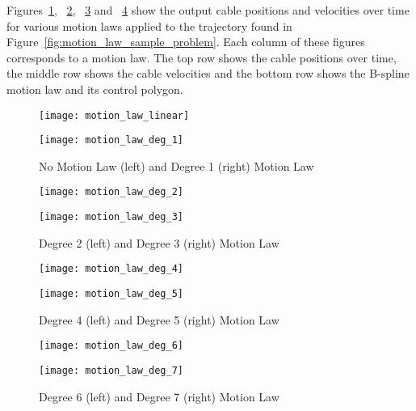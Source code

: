 	Figures~\ref{fig:motion_law_lin_1}, ~\ref{fig:motion_law_2_3},
	~\ref{fig:motion_law_4_5} and ~\ref{fig:motion_law_6_7} show the output
	cable positions and velocities over time for various motion laws applied to
	the trajectory found in Figure~\ref{fig:motion_law_sample_problem}. Each
	column of these figures corresponds to a motion law. The top row shows the
	cable positions over time, the middle row shows the cable velocities and the
	bottom row shows the B-spline motion law and its control polygon.

	\begin{figure}[hb]
		\centering
		\begin{minipage}{0.45\textwidth}
			\texttt{[image: motion\_law\_linear]}
		\end{minipage}%
		\begin{minipage}{0.45\textwidth}
			\texttt{[image: motion\_law\_deg\_1]}
		\end{minipage}
		\caption{No Motion Law (left) and Degree 1 (right) Motion Law}
		\label{fig:motion_law_lin_1}
	\end{figure}

	\begin{figure}[hb]
		\centering
		\begin{minipage}{0.45\textwidth}
			\texttt{[image: motion\_law\_deg\_2]}
		\end{minipage}%
		\begin{minipage}{0.45\textwidth}
			\texttt{[image: motion\_law\_deg\_3]}
		\end{minipage}%
		\caption{Degree 2 (left) and Degree 3 (right) Motion Law}
		\label{fig:motion_law_2_3}
	\end{figure}

	\begin{figure}[hb]
		\centering
		\begin{minipage}{0.45\textwidth}
			\texttt{[image: motion\_law\_deg\_4]}
		\end{minipage}%
		\begin{minipage}{0.45\textwidth}
			\texttt{[image: motion\_law\_deg\_5]}
		\end{minipage}%
		\caption{Degree 4 (left) and Degree 5 (right) Motion Law}
		\label{fig:motion_law_4_5}
	\end{figure}

	\begin{figure}[hb]
		\centering
		\begin{minipage}{0.45\textwidth}
			\texttt{[image: motion\_law\_deg\_6]}
		\end{minipage}%
		\begin{minipage}{0.45\textwidth}
			\texttt{[image: motion\_law\_deg\_7]}
		\end{minipage}%
		\caption{Degree 6 (left) and Degree 7 (right) Motion Law}
		\label{fig:motion_law_6_7}
	\end{figure}

